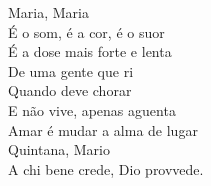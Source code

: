 \begin{otherlanguage}{english}

\begin{flushright}

Maria, Maria\\
É o som, é a cor, é o suor\\
É a dose mais forte e lenta\\
De uma gente que ri\\
Quando deve chorar\\
E não vive, apenas aguenta\\

Amar é mudar a alma de lugar\\
Quintana, Mario\\
\vfill
A chi bene crede, Dio provvede.
\end{flushright}
\end{otherlanguage}

